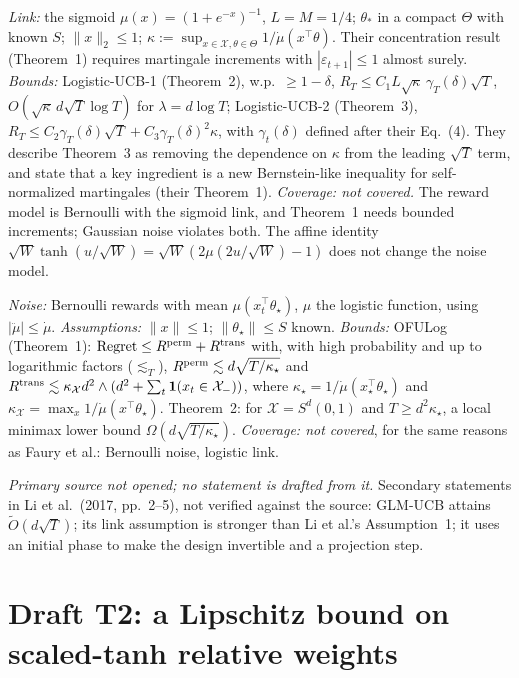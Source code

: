 \begin{description}
\emph{Link:} the sigmoid $\mu(x)=(1+e^{-x})^{-1}$, $L=M=1/4$; $\theta_*$ in a
compact $\Theta$ with known $S$; $\|x\|_2\le1$;
$\kappa:=\sup_{x\in\mathcal X,\theta\in\Theta}1/\dot\mu(x^\top\theta)$. Their
concentration result (Theorem~1) requires martingale increments with
$|\varepsilon_{t+1}|\le1$ almost surely. \emph{Bounds:} Logistic-UCB-1
(Theorem~2), w.p.\ $\ge1-\delta$, $R_T\le C_1L\sqrt\kappa\,\gamma_T(\delta)\sqrt T$,
$O(\sqrt\kappa\,d\sqrt T\log T)$ for $\lambda=d\log T$; Logistic-UCB-2
(Theorem~3), $R_T\le C_2\gamma_T(\delta)\sqrt T+C_3\gamma_T(\delta)^2\kappa$, with
$\gamma_t(\delta)$ defined after their Eq.~(4). They describe Theorem~3 as removing
the dependence on $\kappa$ from the leading $\sqrt T$ term, and state that a key
ingredient is a new Bernstein-like inequality for self-normalized martingales
(their Theorem~1).
\emph{Coverage: not covered.} The reward model is Bernoulli with the sigmoid
link, and Theorem~1 needs bounded increments; Gaussian noise violates both.
The affine identity $\sqrt W\tanh(u/\sqrt W)=\sqrt W(2\mu(2u/\sqrt W)-1)$ does
not change the noise model.
\item[Abeille, Faury and Calauz\`enes (2021).]
\emph{Noise:} Bernoulli rewards with mean $\mu(x_t^\top\theta_\star)$,
$\mu$ the logistic function, using $|\ddot\mu|\le\dot\mu$. \emph{Assumptions:}
$\|x\|\le1$; $\|\theta_\star\|\le S$ known. \emph{Bounds:} OFULog (Theorem~1):
$\mathrm{Regret}\le R^{\rm perm}+R^{\rm trans}$ with, with high probability and
up to logarithmic factors ($\lesssim_T$), $R^{\rm perm}\lesssim d\sqrt{T/\kappa_\star}$
and $R^{\rm trans}\lesssim\kappa_{\mathcal X}d^2\wedge(d^2+\sum_t\mathbf 1(x_t\in\mathcal X_-))$,
where $\kappa_\star=1/\dot\mu(x_\star^\top\theta_\star)$ and
$\kappa_{\mathcal X}=\max_x1/\dot\mu(x^\top\theta_\star)$. Theorem~2: for
$\mathcal X=S^d(0,1)$ and $T\ge d^2\kappa_\star$, a local minimax lower bound
$\Omega(d\sqrt{T/\kappa_\star})$. \emph{Coverage: not covered}, for the same
reasons as Faury et al.: Bernoulli noise, logistic link.
\item[Filippi, Capp\'e, Garivier and Szepesv\'ari (2010).]
\emph{Primary source not opened; no statement is drafted from it.} Secondary
statements in Li et al.\ (2017, pp.~2--5), not verified against the source:
GLM-UCB attains $\tilde O(d\sqrt T)$; its link assumption is stronger than
Li et al.'s Assumption~1; it uses an initial phase to make the design
invertible and a projection step.
\end{description}

\section*{Draft T2: a Lipschitz bound on scaled-tanh relative weights}

